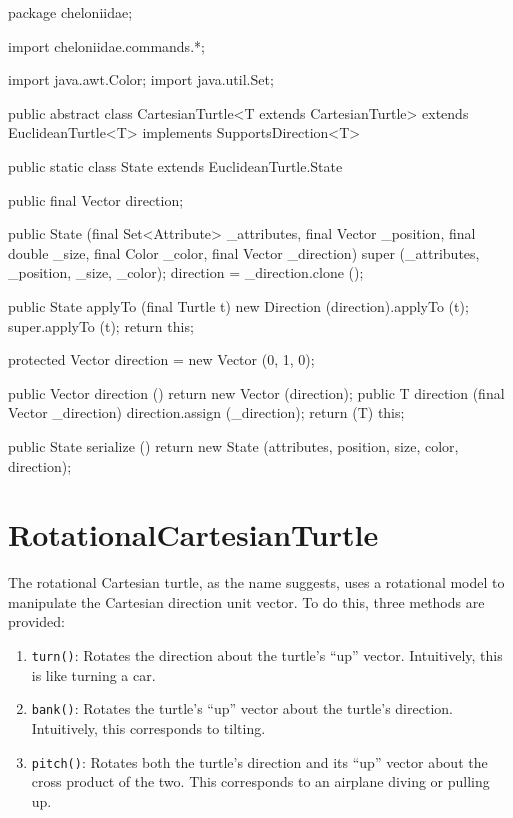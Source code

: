 \documentclass{report}
\begin{document}
\begin{javacode}
package cheloniidae;

import cheloniidae.commands.*;

import java.awt.Color;
import java.util.Set;

public abstract class CartesianTurtle<T extends CartesianTurtle> extends EuclideanTurtle<T>
implements SupportsDirection<T> {

  public static class State extends EuclideanTurtle.State {
    public final Vector direction;
    
    public State (final Set<Attribute> _attributes, final Vector _position, final double _size,
                  final Color _color, final Vector _direction) {
      super (_attributes, _position, _size, _color);
      direction = _direction.clone ();
    }

    public State applyTo (final Turtle t) {
      new Direction (direction).applyTo (t);
      super.applyTo (t);
      return this;
    }
  }

  protected Vector direction = new Vector (0, 1, 0);

  public Vector direction ()                        {return new Vector (direction);}
  public T      direction (final Vector _direction) {direction.assign (_direction); return (T) this;}

  public State serialize () {return new State (attributes, position, size, color, direction);}
}
\end{javacode}

\section {RotationalCartesianTurtle} \label{sec:rotationalcartesianturtle}
      The rotational Cartesian turtle, as the name suggests, uses a rotational model to manipulate the Cartesian direction unit vector. To do this, three
      methods are provided:

\begin{enumerate}
\item \verb|turn()|: Rotates the direction about the turtle's ``up'' vector. Intuitively, this is like turning a car.
\item \verb|bank()|: Rotates the turtle's ``up'' vector about the turtle's direction. Intuitively, this corresponds to tilting.
\item \verb|pitch()|: Rotates both the turtle's direction and its ``up'' vector about the cross product of the two. This corresponds to an airplane diving
          or pulling up.
\end{enumerate}
\end{document}
